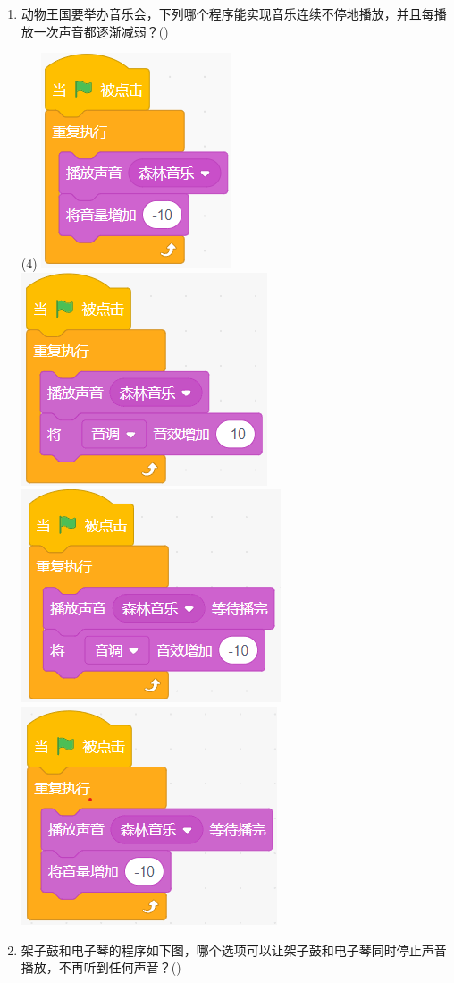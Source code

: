 \documentclass[10pt, a4paper]{article}
\newcommand{\hq}{\hfill(\qquad)}
\begin{document}
\begin{enumerate}
        \item 动物王国要举办音乐会，下列哪个程序能实现音乐连续不停地播放，并且每播放一次声音都逐渐减弱？\hq
        \begin{tasks}(4)
            \task \includegraphics[width=.12\textwidth]{figure/19a.png}
            \task \includegraphics[width=.16\textwidth]{figure/19b.png}
            \task \includegraphics[width=.16\textwidth]{figure/19c.png}
            \task \includegraphics[width=.16\textwidth]{figure/19d.png}
        \end{tasks}

        \item 架子鼓和电子琴的程序如下图，哪个选项可以让架子鼓和电子琴同时停止声音播放，不再听到任何声音？\hq
        

\end{enumerate}
\end{document}
